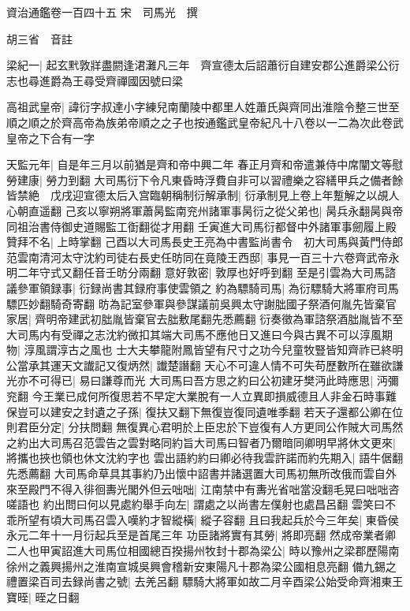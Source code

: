 資治通鑑卷一百四十五
宋　司馬光　撰

胡三省　音註

梁紀一|{
	起玄黓敦牂盡閼逢涒灘凡三年　齊宣德太后詔蕭衍自建安郡公進爵梁公衍志也尋進爵為王尋受齊禪國因號曰梁}


高祖武皇帝|{
	諱衍字叔達小字練兒南蘭陵中都里人姓蕭氏與齊同出淮陰令整三世至順之順之於齊高帝為族弟帝順之之子也按通鑑武皇帝紀凡十八卷以一二為次此卷武皇帝之下合有一字}


天監元年|{
	自是年三月以前猶是齊和帝中興二年}
春正月齊和帝遣兼侍中席闡文等慰勞建康|{
	勞力到翻}
大司馬衍下令凡東昏時浮費自非可以習禮樂之容繕甲兵之備者餘皆禁絶　戊戌迎宣德太后入宫臨朝稱制衍解承制|{
	衍承制見上卷上年蹔解之以覘人心朝直遥翻}
己亥以寧朔將軍蕭昺監南兖州諸軍事昺衍之從父弟也|{
	昺兵永翻昺與帝同祖治書侍御史道賜監工衘翻從才用翻}
壬寅進大司馬衍都督中外諸軍事劒履上殿贊拜不名|{
	上時掌翻}
己酉以大司馬長史王亮為中書監尚書令　初大司馬與黃門侍郎范雲南清河太守沈約司徒右長史任昉同在竟陵王西邸|{
	事見一百三十六卷齊武帝永明二年守式又翻任音壬昉分兩翻}
意好敦密|{
	敦厚也好呼到翻}
至是引雲為大司馬諮議參軍領録事|{
	衍録尚書其録府事使雲領之}
約為驃騎司馬|{
	為衍驃騎大將軍府司馬驃匹妙翻騎奇寄翻}
昉為記室參軍與參謀議前吳興太守謝朏國子祭酒何胤先皆棄官家居|{
	齊明帝建武初朏胤皆棄官去朏敷尾翻先悉薦翻}
衍奏徵為軍諮祭酒朏胤皆不至大司馬内有受禪之志沈約微扣其端大司馬不應他日又進曰今與古異不可以淳風期物|{
	淳風謂淳古之風也}
士大夫攀龍附鳳皆望有尺寸之功今兒童牧豎皆知齊祚已終明公當承其運天文䜟記又復炳然|{
	䜟楚譖翻}
天心不可違人情不可失苟歷數所在雖欲謙光亦不可得已|{
	易曰謙尊而光}
大司馬曰吾方思之約曰公初建牙樊沔此時應思|{
	沔彌兖翻}
今王業已成何所復思若不早定大業脫有一人立異即損威德且人非金石時事難保豈可以建安之封遺之子孫|{
	復扶又翻下無復豈復同遺唯季翻}
若天子還都公卿在位則君臣分定|{
	分扶問翻}
無復異心君明於上臣忠於下豈復有人方更同公作賊大司馬然之約出大司馬召范雲告之雲對略同約旨大司馬曰智者乃爾暗同卿明早將休文更來|{
	將攜也挾也領也休文沈約字也}
雲出語約約曰卿必待我雲許諾而約先期入|{
	語牛倨翻先悉薦翻}
大司馬命草具其事約乃出懷中詔書并諸選置大司馬初無所改俄而雲自外來至殿門不得入徘徊夀光閣外但云咄咄|{
	江南禁中有夀光省咄當没翻毛晃曰咄咄咨嗟語也}
約出問曰何以見處約舉手向左|{
	謂處之以尚書左僕射也處昌呂翻}
雲笑曰不乖所望有頃大司馬召雲入嘆約才智縱橫|{
	縱子容翻}
且曰我起兵於今三年矣|{
	東昏侯永元二年十一月衍起兵至是首尾三年}
功臣諸將實有其勞|{
	將即亮翻}
然成帝業者卿二人也甲寅詔進大司馬位相國總百揆揚州牧封十郡為梁公|{
	時以豫州之梁郡歷陽南徐州之義興揚州之淮南宣城吳興會稽新安東陽凡十郡為梁公國相息亮翻}
備九錫之禮置梁百司去録尚書之號|{
	去羌呂翻}
驃騎大將軍如故二月辛酉梁公始受命齊湘東王寶晊|{
	晊之日翻}

